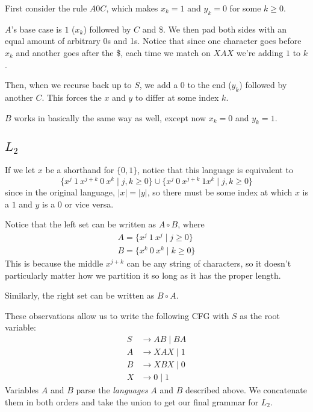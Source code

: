 \documentclass[12pt]{article}
\begin{document}
First consider the rule $A0C$, which makes $x_k=1$ and $y_k=0$ for some $k \ge 0$.

$A$'s base case is $1$ ($x_k$) followed by $C$ and \$.
We then pad both sides with an equal amount of arbitrary 0s and 1s.
Notice that since one character goes before $x_k$ and another goes after the \$,
each time we match on $XAX$ we're adding $1$ to $k$.

Then, when we recurse back up to $S$, we add a 0 to the end ($y_k$)
followed by another $C$.
This forces the $x$ and $y$ to differ at some index $k$.

$B$ works in basically the same way as well, except now $x_k=0$ and $y_k=1$.

\pagebreak

\subsection{\texorpdfstring{$L_2$}{L\_2}}

If we let $x$ be a shorthand for $\{0, 1\}$, notice that this language is equivalent to
\[\{x^j\ 1\ x^{j+k}\ 0\ x^k \mid j, k \ge 0\} \cup \{x^j\ 0\ x^{j+k}\ 1x^k \mid j, k \ge 0\}\]
since in the original language, $|x|=|y|$, so there must be some index
at which $x$ is a $1$ and $y$ is a $0$ or vice versa.

Notice that the left set can be written as $A \circ B$, where
\begin{gather*}
    A=\{x^j\ 1\ x^j \mid j \ge 0\} \\
    B=\{x^k\ 0\ x^k \mid k \ge 0\}
\end{gather*}
This is because the middle $x^{j+k}$ can be any string of characters,
so it doesn't particularly matter how we partition it so long as it has the proper length.

Similarly, the right set can be written as $B \circ A$.

These observations allow us to write the following CFG with $S$ as the root variable:
\begin{align*}
    S & \to AB \mid BA \\
    A & \to XAX \mid 1 \\
    B & \to XBX \mid 0 \\
    X & \to 0 \mid 1
\end{align*}
Variables $A$ and $B$ parse the \textit{languages} $A$ and $B$ described above.
We concatenate them in both orders and take the union to get our final
grammar for $L_2$.
\end{document}
